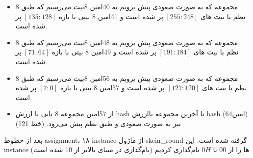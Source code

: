 \begin{itemize}
	\item
	       8 مجموعه که به صورت صعودی پیش برویم به 40امین 8بیت می‌رسیم که طبق نظم با بیت های $[255:248]$ پر شده است و 41امین 8 بیتی با بازه $[135:128]$ پر شده است.
	\item
	       8 مجموعه که به صورت صعودی پیش برویم به 48امین 8بیت می‌رسیم که طبق نظم با بیت های $[191:184]$ پر شده است و 49امین 8 بیتی با بازه $[71:64]$ پر شده است.
	\item
	       8 مجموعه که به صورت صعودی پیش برویم به 56امین 8بیت می‌رسیم که طبق نظم با بیت های $[127:120]$ پر شده است و 57امین 8 بیتی با بازه $[7:0]$ پر شده است.
	\item
	      از 57امین مجموعه 8 تایی با ارزش hash تا آخرین مجموعه باارزش hash (64امین) نیز به صورت صعودی و طبق نظم پیش می‌رود. (خط 121)
	      
\end{itemize}

بعد از خطوط 
assignment،
 ۱۸ instance از ماژول skein\_round گرفته شده است.
این instance ها را از 
$00$
تا
$0H$
نام‌گذاری کردیم (نام‌گذاری در مبنای بالاتر از 10 شده است)

